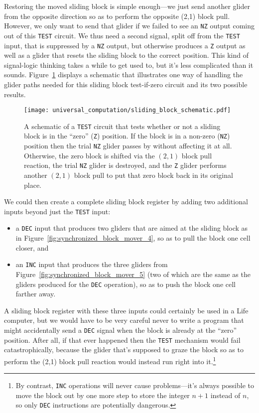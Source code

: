 Restoring the moved sliding block is simple enough---we just send another glider from the opposite direction so as to perform the opposite (2,1) block pull. However, we only want to send that glider if we failed to see an \texttt{NZ} output coming out of this \texttt{TEST} circuit. We thus need a second signal, split off from the \texttt{TEST} input, that is suppressed by a \texttt{NZ} output, but otherwise produces a \texttt{Z} output as well as a glider that resets the sliding block to the correct position. This kind of signal-logic thinking takes a while to get used to, but it's less complicated than it sounds. Figure~\ref{fig:sliding_block_schematic} displays a schematic that illustrates one way of handling the glider paths needed for this sliding block test-if-zero circuit and its two possible results.

\begin{figure}[!htb]
	\centering
	\texttt{[image: universal\_computation/sliding\_block\_schematic.pdf]}
	\caption{A schematic of a \texttt{TEST} circuit that tests whether or not a sliding block is in the ``zero'' (\texttt{Z}) position. If the block is in a non-zero (\texttt{NZ}) position then the trial \texttt{NZ} glider passes by without affecting it at all. Otherwise, the zero block is shifted via the $(2,1)$ block pull reaction, the trial \texttt{NZ} glider is destroyed, and the \texttt{Z} glider performs another $(2,1)$ block pull to put that zero block back in its original place.}\label{fig:sliding_block_schematic}
\end{figure}

We could then create a complete sliding block register by adding two additional inputs beyond just the \texttt{TEST} input:\smallskip

\begin{itemize}
	\item a \texttt{DEC} input that produces two gliders that are aimed at the sliding block as in Figure~\ref{fig:synchronized_block_mover_4}, so as to pull the block one cell closer, and\smallskip
	
	\item an \texttt{INC} input that produces the three gliders from Figure~\ref{fig:synchronized_block_mover_5} (two of which are the same as the gliders produced for the \texttt{DEC} operation), so as to push the block one cell farther away.\smallskip
\end{itemize}

A sliding block register with these three inputs could certainly be used in a Life computer, but we would have to be very careful never to write a program that might accidentally send a \texttt{DEC} signal when the block is already at the ``zero'' position. After all, if that ever happened then the \texttt{TEST} mechanism would fail catastrophically, because the glider that's supposed to graze the block so as to perform the (2,1) block pull reaction would instead run right into it.\footnote{By contrast, \texttt{INC} operations will never cause problems---it's always possible to move the block out by one more step to store the integer $n+1$ instead of $n$, so only \texttt{DEC} instructions are potentially dangerous.}

